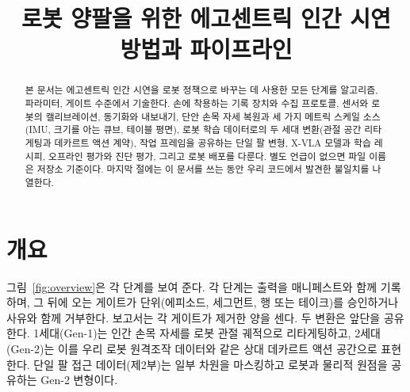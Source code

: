 \documentclass[conference,10pt]{IEEEtran}
\begin{document}
\title{로봇 양팔을 위한 에고센트릭 인간 시연\\방법과 파이프라인}
\author{
}
\maketitle

\begin{abstract}
본 문서는 에고센트릭 인간 시연을 로봇 정책으로 바꾸는 데 사용한 모든 단계를 알고리즘, 파라미터, 게이트 수준에서 기술한다. 손에
착용하는 기록 장치와 수집 프로토콜, 센서와 로봇의 캘리브레이션, 동기화와 내보내기, 단안 손목 자세 복원과 세 가지 메트릭 스케일
소스(IMU, 크기를 아는 큐브, 테이블 평면), 로봇 학습 데이터로의 두 세대 변환(관절 공간 리타게팅과 데카르트 액션 계약), 작업
프레임을 공유하는 단일 팔 변형, X-VLA 모델과 학습 레시피, 오프라인 평가와 진단 평가, 그리고 로봇 배포를 다룬다. 별도 언급이 없으면
파일 이름은 저장소 기준이다. 마지막 절에는 이 문서를 쓰는 동안 우리 코드에서 발견한 불일치를 나열한다.
\end{abstract}

\section{개요}
그림~\ref{fig:overview}은 각 단계를 보여 준다. 각 단계는 출력을 매니페스트와 함께 기록하며, 그 뒤에 오는 게이트가 단위(에피소드,
세그먼트, 행 또는 테이크)를 승인하거나 사유와 함께 거부한다. 보고서는 각 게이트가 제거한 양을 센다. 두 변환은 앞단을 공유한다.
1세대(Gen-1)는 인간 손목 자세를 로봇 관절 궤적으로 리타게팅하고, 2세대(Gen-2)는 이를 우리 로봇 원격조작 데이터와 같은 상대
데카르트 액션 공간으로 표현한다. 단일 팔 접근 데이터(제2부)는 일부 차원을 마스킹하고 로봇과 물리적 원점을 공유하는 Gen-2 변형이다.
\end{document}
